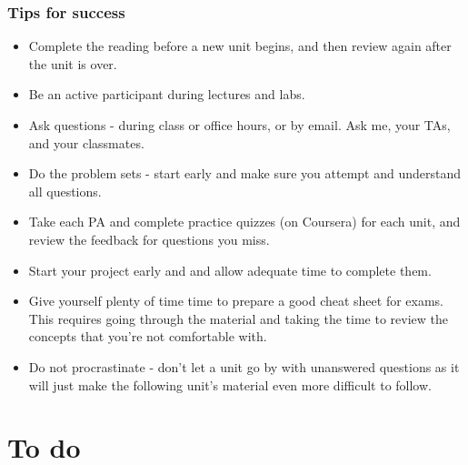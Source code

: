 \documentclass[11pt,containsverbatim,handout,xcolor=xelatex,dvipsnames,table]{beamer}
\begin{document}
\begin{frame}
\frametitle{Tips for success}

{\footnotesize
\begin{itemize}[<alert@+>]
\item Complete the reading before a new unit begins, and then review again after the 
unit is over.
\item Be an active participant during lectures and labs.
\item Ask questions - during class or office hours, or by email. Ask me, your TAs, and 
your classmates.
\item Do the problem sets - start early and make sure you attempt and understand all 
questions.
\item Take each PA and complete practice quizzes (on Coursera) for each unit, and
review the feedback for questions you miss.
\item Start your project early and and allow adequate time to complete them.
\item Give yourself plenty of time time to prepare a good cheat sheet for exams. This 
requires going through the material and taking the time to review the concepts that 
you're not comfortable with.
\item Do not procrastinate - don't let a unit go by with unanswered questions as it 
will just make the following unit's material even more difficult to follow. 
\end{itemize}
}

\end{frame}


\section{To do}

\end{document}
